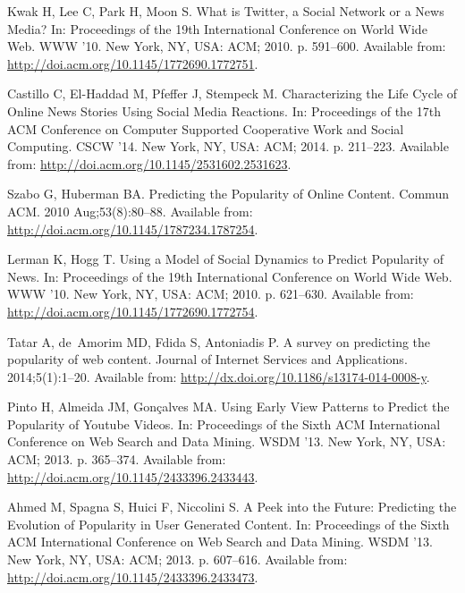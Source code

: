 \documentclass[10pt,letterpaper]{article}
\begin{document}
\begin{thebibliography}{10}

Kwak H, Lee C, Park H, Moon S.
\newblock What is Twitter, a Social Network or a News Media?
\newblock In: Proceedings of the 19th International Conference on World Wide
  Web. WWW '10. New York, NY, USA: ACM; 2010. p. 591--600.
\newblock Available from: \url{http://doi.acm.org/10.1145/1772690.1772751}.

Castillo C, El-Haddad M, Pfeffer J, Stempeck M.
\newblock Characterizing the Life Cycle of Online News Stories Using Social
  Media Reactions.
\newblock In: Proceedings of the 17th ACM Conference on Computer Supported
  Cooperative Work and Social Computing. CSCW '14. New York, NY, USA: ACM;
  2014. p. 211--223.
\newblock Available from: \url{http://doi.acm.org/10.1145/2531602.2531623}.

Szabo G, Huberman BA.
\newblock Predicting the Popularity of Online Content.
\newblock Commun ACM. 2010 Aug;53(8):80--88.
\newblock Available from: \url{http://doi.acm.org/10.1145/1787234.1787254}.

Lerman K, Hogg T.
\newblock Using a Model of Social Dynamics to Predict Popularity of News.
\newblock In: Proceedings of the 19th International Conference on World Wide
  Web. WWW '10. New York, NY, USA: ACM; 2010. p. 621--630.
\newblock Available from: \url{http://doi.acm.org/10.1145/1772690.1772754}.

Tatar A, de~Amorim MD, Fdida S, Antoniadis P.
\newblock A survey on predicting the popularity of web content.
\newblock Journal of Internet Services and Applications. 2014;5(1):1--20.
\newblock Available from: \url{http://dx.doi.org/10.1186/s13174-014-0008-y}.

Pinto H, Almeida JM, Gon\c{c}alves MA.
\newblock Using Early View Patterns to Predict the Popularity of Youtube
  Videos.
\newblock In: Proceedings of the Sixth ACM International Conference on Web
  Search and Data Mining. WSDM '13. New York, NY, USA: ACM; 2013. p. 365--374.
\newblock Available from: \url{http://doi.acm.org/10.1145/2433396.2433443}.

Ahmed M, Spagna S, Huici F, Niccolini S.
\newblock A Peek into the Future: Predicting the Evolution of Popularity in
  User Generated Content.
\newblock In: Proceedings of the Sixth ACM International Conference on Web
  Search and Data Mining. WSDM '13. New York, NY, USA: ACM; 2013. p. 607--616.
\newblock Available from: \url{http://doi.acm.org/10.1145/2433396.2433473}.


\end{thebibliography}
\end{document}
